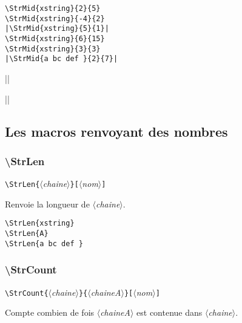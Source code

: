 \documentclass[a4paper,10pt]{article}
\newcommand\argu[1]{$\langle$\textit{#1}$\rangle$}
\newcommand\ARGU[1]{\texttt{\color{black}\{}\argu{#1}\texttt{\color{black}\}}}
\newcommand\arguC[1]{\texttt{\color{black}[}\argu{#1}\texttt{\color{black}]}}
\newcommand\styleexemple{\small\vskip4pt}
\newcommand\verbinline{\lstinline[basicstyle=\normalsize\ttfamily]}
\begin{document}
\begin{minipage}[t]{0.65\linewidth}
\begin{lstlisting}
\StrMid{xstring}{2}{5}
\StrMid{xstring}{-4}{2}
|\StrMid{xstring}{5}{1}|
\StrMid{xstring}{6}{15}
\StrMid{xstring}{3}{3}
|\StrMid{a bc def }{2}{7}|
\end{lstlisting}%
\end{minipage}\hfill
\begin{minipage}[t]{0.35\linewidth}
	\styleexemple
	\par
	\par
	||\par
	\par
	\par
	||
\end{minipage}%

\subsection{Les macros renvoyant des nombres}
\subsubsection{\ttfamily\textbackslash StrLen}
\verbinline|\StrLen|\ARGU{chaine}\arguC{nom}
\smallskip

Renvoie la longueur de \argu{chaine}.

\begin{minipage}[t]{0.65\linewidth}
\begin{lstlisting}
\StrLen{xstring}
\StrLen{A}
\StrLen{a bc def }
\end{lstlisting}%
\end{minipage}\hfill
\begin{minipage}[t]{0.35\linewidth}
	\styleexemple
	\par
	\par
\end{minipage}%

\subsubsection{\ttfamily\textbackslash StrCount}
\verbinline|\StrCount|\ARGU{chaine}\ARGU{chaineA}\arguC{nom}
\smallskip

Compte combien de fois \argu{chaineA} est contenue dans \argu{chaine}.\par\medskip
\end{document}
